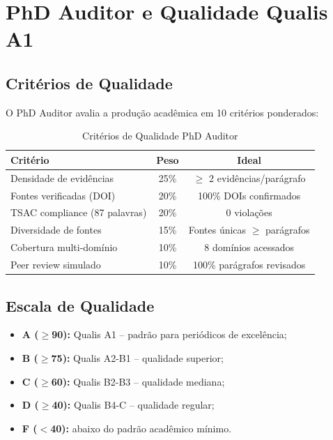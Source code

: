 \documentclass[12pt,a4paper,sumario=tradicional]{abntex2}
\begin{document}
\chapter{PhD Auditor e Qualidade Qualis A1}

\section{Critérios de Qualidade}

O PhD Auditor avalia a produção acadêmica em 10 critérios ponderados:

\begin{longtable}{@{}lcc@{}}
\caption{Critérios de Qualidade PhD Auditor}\\
\toprule
\textbf{Critério} & \textbf{Peso} & \textbf{Ideal} \\
\midrule
Densidade de evidências & 25\% & $\geq$ 2 evidências/parágrafo \\
Fontes verificadas (DOI) & 20\% & 100\% DOIs confirmados \\
TSAC compliance (87 palavras) & 20\% & 0 violações \\
Diversidade de fontes & 15\% & Fontes únicas $\geq$ parágrafos \\
Cobertura multi-domínio & 10\% & 8 domínios acessados \\
Peer review simulado & 10\% & 100\% parágrafos revisados \\
\bottomrule
\end{longtable}

\section{Escala de Qualidade}

\begin{itemize}
    \item \textbf{A ($\geq$90):} Qualis A1 -- padrão para periódicos de excelência;
    \item \textbf{B ($\geq$75):} Qualis A2-B1 -- qualidade superior;
    \item \textbf{C ($\geq$60):} Qualis B2-B3 -- qualidade mediana;
    \item \textbf{D ($\geq$40):} Qualis B4-C -- qualidade regular;
    \item \textbf{F ($<$40):} abaixo do padrão acadêmico mínimo.
\end{itemize}
\end{document}
